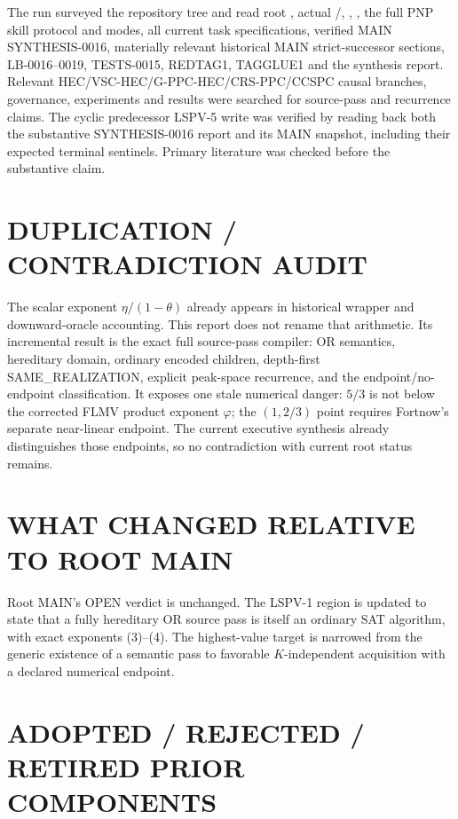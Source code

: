 \documentclass[11pt]{article}
\begin{document}
The run surveyed the repository tree and read root , actual
/, , , the full
PNP skill protocol and modes, all current task specifications, verified MAIN
SYNTHESIS-0016, materially relevant historical MAIN strict-successor
sections, LB-0016--0019, TESTS-0015, REDTAG1, TAGGLUE1 and the synthesis
report.  Relevant HEC/VSC-HEC/G-PPC-HEC/CRS-PPC/CCSPC causal branches,
governance, experiments and results were searched for source-pass and
recurrence claims.  The cyclic predecessor LSPV-5 write was verified by
reading back both the substantive SYNTHESIS-0016 report and its MAIN snapshot,
including their expected terminal sentinels.  Primary literature was checked
before the substantive claim.

\section{DUPLICATION / CONTRADICTION AUDIT}

The scalar exponent $\eta/(1-\theta)$ already appears in historical wrapper
and downward-oracle accounting.  This report does not rename that arithmetic.
Its incremental result is the exact full source-pass compiler: OR semantics,
hereditary domain, ordinary encoded children, depth-first SAME\_REALIZATION,
explicit peak-space recurrence, and the endpoint/no-endpoint classification.
It exposes one stale numerical danger: $5/3$ is not below the corrected FLMV
product exponent $\varphi$; the $(1,2/3)$ point requires Fortnow's separate
near-linear endpoint.  The current executive synthesis already distinguishes
those endpoints, so no contradiction with current root status remains.

\section{WHAT CHANGED RELATIVE TO ROOT MAIN}

Root MAIN's OPEN verdict is unchanged.  The LSPV-1 region is updated to state
that a fully hereditary OR source pass is itself an ordinary SAT algorithm,
with exact exponents (3)--(4).  The highest-value target is narrowed from the
generic existence of a semantic pass to favorable $K$-independent acquisition
with a declared numerical endpoint.

\section{ADOPTED / REJECTED / RETIRED PRIOR COMPONENTS}
\end{document}
